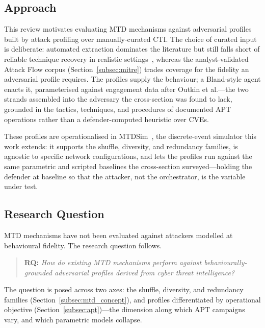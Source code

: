 \subsection{Approach}
\label{subsec:approach}

This review motivates evaluating MTD mechanisms against adversarial
profiles built by attack profiling over manually-curated CTI. The choice
of curated input is deliberate: automated extraction dominates the
literature but still falls short of reliable technique recovery in
realistic settings~\cite{buchel2025}, whereas the analyst-validated Attack
Flow corpus (Section~\ref{subsec:mitre}) trades coverage for the fidelity
an adversarial profile requires. The profiles supply the behaviour; a
Bland-style agent enacts it, parameterised against engagement data after
Outkin et al.---the two strands assembled into the adversary the
cross-section was found to lack, grounded in the tactics, techniques, and
procedures of documented APT operations rather than a defender-computed
heuristic over CVEs.

These profiles are operationalised in MTDSim~\cite{brown2023}, the
discrete-event simulator this work extends: it supports the shuffle,
diversity, and redundancy families, is agnostic to specific network
configurations, and lets the profiles run against the same parametric and
scripted baselines the cross-section surveyed---holding the defender at
baseline so that the attacker, not the orchestrator, is the variable under
test.

\subsection{Research Question}
\label{subsec:rq}

MTD mechanisms have not been evaluated against attackers modelled at
behavioural fidelity. The research question follows.
\begin{quote}
\textbf{RQ:} \textit{How do existing MTD mechanisms perform against behaviourally-grounded adversarial profiles derived from cyber threat intelligence?}
\end{quote}
The question is posed across two axes: the shuffle, diversity, and
redundancy families (Section~\ref{subsec:mtd_concept}), and profiles
differentiated by operational objective (Section~\ref{subsec:apt})---the
dimension along which APT campaigns vary, and which parametric models
collapse.


